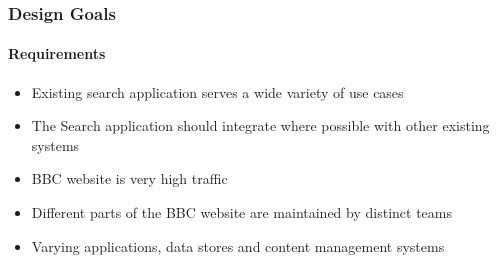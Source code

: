\documentclass{beamer}
\begin{document}
\begin{frame}
  \frametitle{Design Goals}
  \framesubtitle{Requirements}
  \begin{itemize}
    \item Existing search application serves a wide variety of use cases
    \item The Search application should integrate where possible with other existing systems
    \item BBC website is very high traffic
    \item Different parts of the BBC website are maintained by distinct teams
    \item Varying applications, data stores and content management systems
  \end{itemize}
\end{frame}
\end{document}
